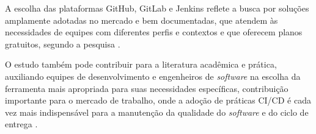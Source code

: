 A escolha das plataformas GitHub, GitLab e Jenkins reflete a busca por soluções amplamente adotadas no mercado e bem documentadas, que atendem às necessidades de equipes com diferentes perfis e contextos e que oferecem planos gratuitos, segundo a pesquisa \cite{bluelightCo}.

O estudo também pode contribuir para a literatura acadêmica e prática, auxiliando equipes de desenvolvimento e engenheiros de \textit{software} na escolha da ferramenta mais apropriada para suas necessidades específicas, contribuição importante para o mercado de trabalho, onde a adoção de práticas CI/CD é cada vez mais indispensável para a manutenção da qualidade do \textit{software} e do ciclo de entrega \cite{RiunguKalliosaari2016}.


 